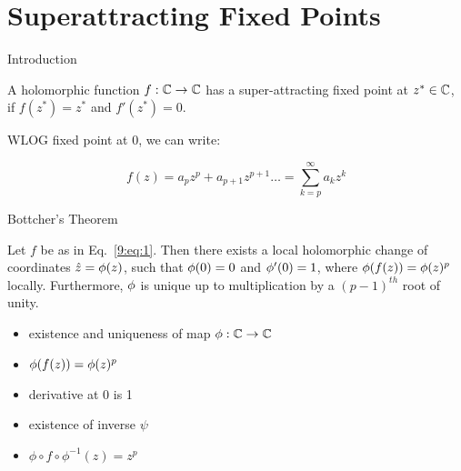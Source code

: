 \section{Superattracting Fixed Points}
\sectiontitleframe

\begin{frame}{Introduction}

    \begin{definition}
    A holomorphic function $f : \mathbb{C} \rightarrow \mathbb{C}$ has a super-attracting fixed point at $z^* \in \mathbb{C}$, if $f(z^*)=z^*$ and $f'(z^*) = 0$.
    \end{definition}\bigskip
    
    WLOG fixed point at 0, we can write:
    
    \begin{equation}
    \label{9:eq:1}
    f(z) = a_pz^p + a_{p+1}z^{p+1}\dots = \sum_{k=p}^{\infty} a_{k}z^k
    \end{equation}
    
\end{frame}


\begin{frame}{Bottcher's Theorem}

\begin{thm}
    \label{9:thm:bottcher}
    Let $f$ be as in Eq.~\ref{9:eq:1}. Then there exists a local holomorphic change of coordinates $\hat{z} = \phi(z)$, such that $\phi(0) = 0$ and $\phi'(0) = 1$, where $\phi(f(z)) = \phi(z)^p$ locally. Furthermore, $\phi$ is unique up to multiplication by a $(p-1)^{th}$ root of unity. 
\end{thm}
\medskip
    
    \begin{itemize}
        \item existence and uniqueness of map $\phi : \mathbb{C} \rightarrow \mathbb{C}$
        \item $\phi(f(z)) = \phi(z)^p$
        \item derivative at 0 is 1
        \item existence of inverse $\psi$
        \item $\phi \circ f \circ \phi^{-1} (z) = z^p$
        
    \end{itemize}
    
\end{frame}




